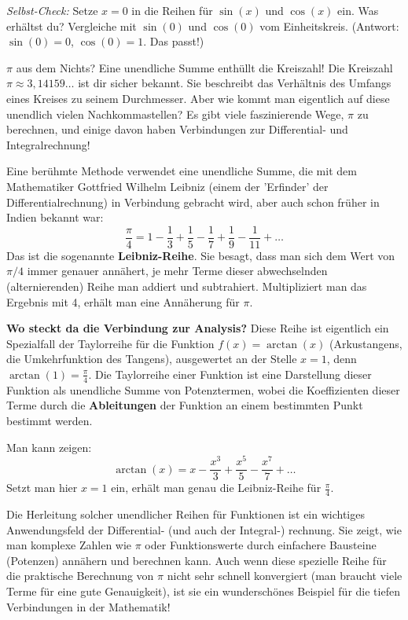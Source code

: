 \textit{Selbst-Check:} Setze $x=0$ in die Reihen für $\sin(x)$ und $\cos(x)$ ein. Was erhältst du? Vergleiche mit $\sin(0)$ und $\cos(0)$ vom Einheitskreis. (Antwort: $\sin(0)=0$, $\cos(0)=1$. Das passt!)
\begin{funfactbox}{$\pi$ aus dem Nichts? Eine unendliche Summe enthüllt die Kreiszahl!}
Die Kreiszahl $\pi \approx 3,14159\dots$ ist dir sicher bekannt. Sie beschreibt das Verhältnis des Umfangs eines Kreises zu seinem Durchmesser. Aber wie kommt man eigentlich auf diese unendlich vielen Nachkommastellen? Es gibt viele faszinierende Wege, $\pi$ zu berechnen, und einige davon haben Verbindungen zur Differential- und Integralrechnung!

Eine berühmte Methode verwendet eine unendliche Summe, die mit dem Mathematiker Gottfried Wilhelm Leibniz (einem der 'Erfinder' der Differentialrechnung) in Verbindung gebracht wird, aber auch schon früher in Indien bekannt war:
\[ \frac{\pi}{4} = 1 - \frac{1}{3} + \frac{1}{5} - \frac{1}{7} + \frac{1}{9} - \frac{1}{11} + \dots \]
Das ist die sogenannte \textbf{Leibniz-Reihe}. Sie besagt, dass man sich dem Wert von $\pi/4$ immer genauer annähert, je mehr Terme dieser abwechselnden (alternierenden) Reihe man addiert und subtrahiert. Multipliziert man das Ergebnis mit 4, erhält man eine Annäherung für $\pi$.

\textbf{Wo steckt da die Verbindung zur Analysis?}
Diese Reihe ist eigentlich ein Spezialfall der Taylorreihe für die Funktion $f(x) = \arctan(x)$ (Arkustangens, die Umkehrfunktion des Tangens), ausgewertet an der Stelle $x=1$, denn $\arctan(1) = \frac{\pi}{4}$.
Die Taylorreihe einer Funktion ist eine Darstellung dieser Funktion als unendliche Summe von Potenztermen, wobei die Koeffizienten dieser Terme durch die \textbf{Ableitungen} der Funktion an einem bestimmten Punkt bestimmt werden.

Man kann zeigen:
\[ \arctan(x) = x - \frac{x^3}{3} + \frac{x^5}{5} - \frac{x^7}{7} + \dots \]
Setzt man hier $x=1$ ein, erhält man genau die Leibniz-Reihe für $\frac{\pi}{4}$.

Die Herleitung solcher unendlicher Reihen für Funktionen ist ein wichtiges Anwendungsfeld der Differential- (und auch der Integral-) rechnung. Sie zeigt, wie man komplexe Zahlen wie $\pi$ oder Funktionswerte durch einfachere Bausteine (Potenzen) annähern und berechnen kann. Auch wenn diese spezielle Reihe für die praktische Berechnung von $\pi$ nicht sehr schnell konvergiert (man braucht viele Terme für eine gute Genauigkeit), ist sie ein wunderschönes Beispiel für die tiefen Verbindungen in der Mathematik!


\end{funfactbox}
